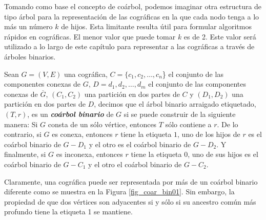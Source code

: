 Tomando como base el concepto de coárbol, podemos imaginar otra estructura de tipo árbol para la representación de las cográficas en la que cada nodo tenga a lo más un número $k$ de hijos. Esta limitante resulta útil para formular algoritmos rápidos en cográficas. El menor valor que puede tomar $k$ es de 2. Este valor será utilizado a lo largo de este capítulo para representar a las cográficas a través de árboles binarios.


\begin{definition}{}

    Sean $G=(V,E)$ una cográfica, $C = \{c_1, c_2, \dots, c_n$\} el conjunto de las componentes conexas de $G$, $D = {d_1, d_2, \dots, d_m}$ el conjunto de las componentes conexas de $\overline{G}$, $(C_1, C_2)$ una partición en dos partes de $C$ y $(D_1, D_2)$ una partición en dos partes de $D$, decimos que el árbol binario arraigado etiquetado, $(T,r)$, es un \textbf{\emph{coárbol binario}} de $G$ si se puede construir de la siguiente manera: Si $G$ consta de un sólo vértice, entonces $T$ sólo contiene a $r$. De lo contrario, si $G$ es conexa, entonces $r$ tiene la etiqueta $1$, uno de los hijos de $r$ es el coárbol binario de $G-D_1$ y el otro es el coárbol binario de $G-D_2$. Y finalmente, si $G$ es inconexa, entonces $r$ tiene la etiqueta $0$, uno de sus hijos es el coárbol binario de $G-C_1$ y el otro el coárbol binario de $G-C_2$.


\end{definition}

Claramente, una cográfica puede ser representada por más de un coárbol binario diferente como se muestra en la Figura \ref{fig_coar_bin01}. Sin embargo, la propiedad de que dos vértices son adyacentes si y sólo si su ancestro común más profundo tiene la etiqueta 1 se mantiene.

